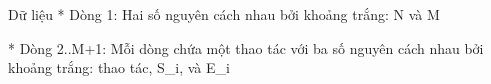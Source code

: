 Dữ liệu
* Dòng 1: Hai số nguyên cách nhau bởi khoảng trắng: N và M  

   * Dòng 2..M+1: Mỗi dòng chứa một thao tác với ba số nguyên cách nhau bởi khoảng trắng: thao tác, S\_i, và E\_i
